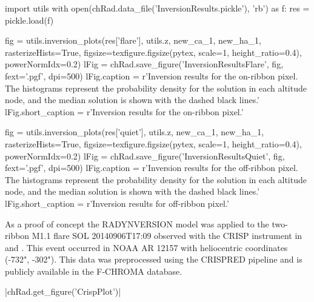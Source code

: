 \begin{pycode}[Radynversion]

import utils
with open(chRad.data_file('InversionResults.pickle'), 'rb') as f:
    res = pickle.load(f)

fig = utils.inversion_plots(res['flare'], utils.z, new_ca_1, new_ha_1, rasterizeHists=True, figsize=texfigure.figsize(pytex, scale=1, height_ratio=0.4), powerNormIdx=0.2)
lFig = chRad.save_figure('InversionResultsFlare', fig, fext='.pgf', dpi=500)
lFig.caption = r'Inversion results for the on-ribbon pixel. The histograms represent the probability density for the solution in each altitude node, and the median solution is shown with the dashed black lines.'
lFig.short_caption = r'Inversion results for the on-ribbon pixel.'

fig = utils.inversion_plots(res['quiet'], utils.z, new_ca_1, new_ha_1, rasterizeHists=True, figsize=texfigure.figsize(pytex, scale=1, height_ratio=0.4), powerNormIdx=0.2)
lFig = chRad.save_figure('InversionResultsQuiet', fig, fext='.pgf', dpi=500)
lFig.caption = r'Inversion results for the off-ribbon pixel. The histograms represent the probability density for the solution in each altitude node, and the median solution is shown with the dashed black lines.'
lFig.short_caption = r'Inversion results for off-ribbon pixel.'
\end{pycode}

As a proof of concept the RADYNVERSION model was applied to the two-ribbon M1.1 flare SOL 20140906T17:09 observed with the CRISP instrument in \Ha{} and \CaLine{}.
This event occurred in NOAA AR 12157 with heliocentric coordinates (-732", -302").
This data was preprocessed using the CRISPRED pipeline \citep{2015dlcr} and is publicly available in the F-CHROMA database.

\py[Radynversion]|chRad.get_figure('CrispPlot')|

